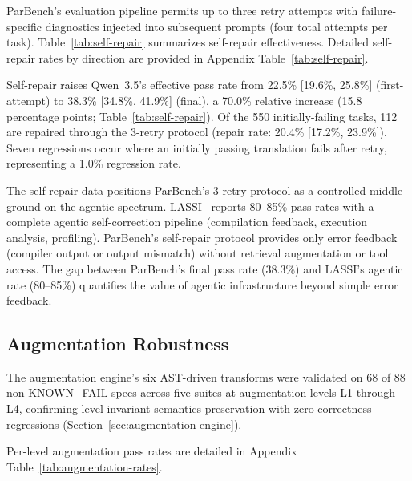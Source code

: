 \documentclass[conference]{IEEEtran}
\begin{document}
ParBench's evaluation pipeline permits up to three retry attempts with failure-specific diagnostics injected into subsequent prompts (four total attempts per task). Table~\ref{tab:self-repair} summarizes self-repair effectiveness.
Detailed self-repair rates by direction are provided in Appendix Table~\ref{tab:self-repair}.


Self-repair raises Qwen~3.5's effective pass rate from 22.5\% [19.6\%, 25.8\%] (first-attempt) to 38.3\% [34.8\%, 41.9\%] (final), a 70.0\% relative increase (15.8 percentage points; Table~\ref{tab:self-repair}). Of the 550 initially-failing tasks, 112 are repaired through the 3-retry protocol (repair rate: 20.4\% [17.2\%, 23.9\%]). Seven regressions occur where an initially passing translation fails after retry, representing a 1.0\% regression rate.

The self-repair data positions ParBench's 3-retry protocol as a controlled middle ground on the agentic spectrum. LASSI~\cite{LASSI2024} reports 80--85\% pass rates with a complete agentic self-correction pipeline (compilation feedback, execution analysis, profiling). ParBench's self-repair protocol provides only error feedback (compiler output or output mismatch) without retrieval augmentation or tool access. The gap between ParBench's final pass rate (38.3\%) and LASSI's agentic rate (80--85\%) quantifies the value of agentic infrastructure beyond simple error feedback.

\subsection{Augmentation Robustness}
\label{sec:augmentation-robustness}

The augmentation engine's six AST-driven transforms were validated on 68 of 88 non-KNOWN\_FAIL specs across five suites at augmentation levels L1 through L4, confirming level-invariant semantics preservation with zero correctness regressions (Section~\ref{sec:augmentation-engine}).

Per-level augmentation pass rates are detailed in Appendix Table~\ref{tab:augmentation-rates}.
\end{document}
